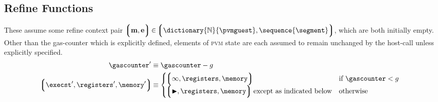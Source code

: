 \subsection{Refine Functions}\label{sec:refinefunctions}

These assume some refine context pair $\tup{\mathbf{m}, \mathbf{e}} \in \tuple{\dictionary{\N}{\pvmguest}, \sequence{\segment}}$, which are both initially empty. Other than the gas-counter which is explicitly defined, elements of \textsc{pvm} state are each assumed to remain unchanged by the host-call unless explicitly specified.
\begin{align}
  \gascounter' &\equiv \gascounter - g\\
  \tup{\execst', \registers', \memory'} &\equiv \begin{cases}
    \tup{\oog, \registers, \memory} &\when \gascounter < g\\
    \tup{\continue, \registers, \memory} \text{ except as indicated below} &\otherwise
  \end{cases}
\end{align}


